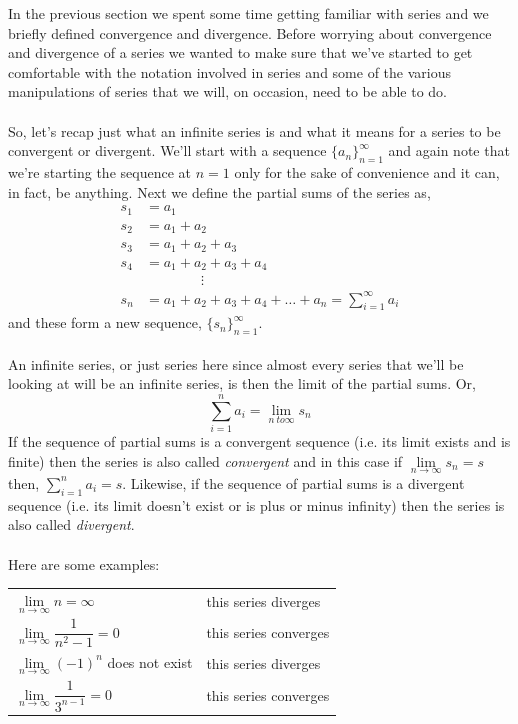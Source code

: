 \documentclass[10pt,reqno]{book}
\theoremstyle{definition}
\begin{document}
	In the previous section we spent some time getting familiar with series and we briefly defined convergence and divergence. Before worrying about convergence and divergence of a series we wanted to make sure that we've started to get comfortable with the notation involved in series and some of the various manipulations of series that we will, on occasion, need to be able to do.\\ \\
	So, let's recap just what an infinite series is and what it means for a series to be convergent or divergent. We'll start with a sequence $ \{ a_n \}_{n=1}^{\infty} $ and again note that we're starting the sequence at $ n=1 $ only for the sake of convenience and it can, in fact, be anything. Next we define the partial sums of the series as,
	\begin{align*}
	s_1 &= a_1\\
	s_2 &= a_1 + a_2\\
	s_3 &= a_1 + a_2 + a_3\\
	s_4 &= a_1 + a_2 + a_3 + a_4\\
	& \qquad \qquad \vdots\\
	s_n &= a_1 + a_2 + a_3 + a_4 + \ldots + a_n = \sum\limits_{i=1}^{\infty} a_i
	\end{align*}
	and these form a new sequence, $ \{ s_n \}_{n=1}^{\infty} $.\\ \\
	An infinite series, or just series here since almost every series that we'll be looking at will be an infinite series, is then the limit of the partial sums. Or,
	\[ \sum\limits_{i=1}^{n} a_i = \lim\limits_{n\ to \infty} s_n \]
	If the sequence of partial sums is a convergent sequence (i.e. its limit exists and is finite) then the series is also called \textit{convergent} and in this case if $ \lim\limits_{n \to \infty} s_n = s $ then, $ \sum_{i = 1}^{n} a_i = s $.  Likewise, if the sequence of partial sums is a divergent sequence (i.e. its limit doesn’t exist or is plus or minus infinity) then the series is also called \textit{divergent}.\\ \\
	Here are some examples:
	\begin{center}
		\begin{tabular}{ll}
			$ \lim\limits_{n \to \infty} n = \infty $ & this series diverges\\[3ex]
			$ \lim\limits_{n \to \infty} \dfrac{1}{n^2 - 1} = 0 $ & this series converges\\[3ex]
			$ \lim\limits_{n \to \infty} (-1)^n $ does not exist & this series diverges\\[3ex]
			$ \lim\limits_{n \to \infty} \dfrac{1}{3^{n-1}} = 0 $ & this series converges
		\end{tabular}		
	\end{center}
\end{document}
